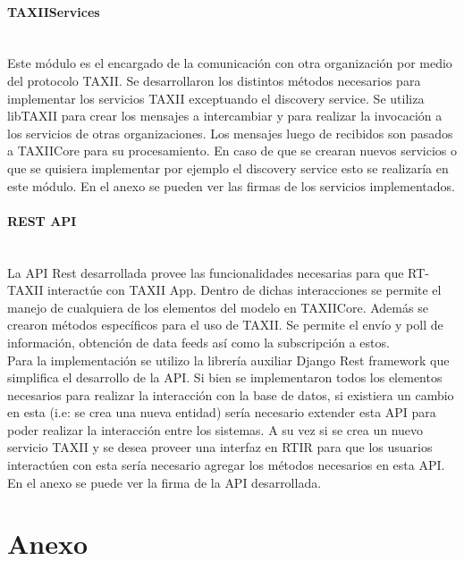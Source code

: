 \documentclass[11pt]{article}
\begin{document}
\paragraph{TAXIIServices}\ \\
Este módulo es el encargado de la comunicación con otra organización por medio del protocolo TAXII. Se desarrollaron  los distintos métodos necesarios para implementar los servicios TAXII exceptuando el discovery service.
Se utiliza libTAXII para crear los mensajes a intercambiar y para realizar la invocación a los servicios de otras organizaciones.
Los mensajes luego de recibidos son pasados a TAXIICore para su procesamiento.
En caso de que se crearan nuevos servicios o que se quisiera implementar por ejemplo el discovery service esto se realizaría en este módulo.
En el anexo se pueden ver las firmas de los servicios implementados.

\paragraph{REST API}\ \\
La API Rest desarrollada provee las funcionalidades necesarias para que RT-TAXII interactúe con TAXII App. Dentro de dichas interacciones se permite el manejo de cualquiera de los elementos del modelo en TAXIICore. Además se crearon métodos específicos para el uso de TAXII. Se permite el envío y poll de información, obtención de data feeds así como la subscripción a estos.\\

Para la implementación se utilizo la librería auxiliar Django Rest framework que simplifica el desarrollo de la API.
Si bien se implementaron todos los elementos necesarios para realizar la interacción con la base de datos, si existiera un cambio en esta (i.e: se crea una nueva entidad) sería necesario extender esta API para poder realizar la interacción entre los sistemas. A su vez si se crea un nuevo servicio TAXII y se desea proveer una interfaz en RTIR para que los usuarios interactúen con esta sería necesario agregar los métodos necesarios en esta API.
En el anexo se puede ver la firma de la API desarrollada.

\section{Anexo}
\end{document}
